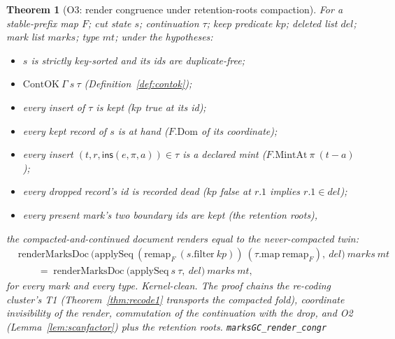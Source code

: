 \documentclass[11pt]{article}
\newtheorem{theorem}{Theorem}[section]
\newcommand{\lean}[1]{\texttt{#1}}
\newcommand{\ins}{\mathsf{ins}}
\begin{document}
\begin{theorem}[O3: render congruence under retention-roots
compaction]
\label{thm:marksgc}
For a stable-prefix map $F$; cut state $s$; continuation $\tau$; keep
predicate $\mathit{kp}$; deleted list $\mathit{del}$; mark list
$\mathit{marks}$; type $\mathit{mt}$; under the hypotheses:
\begin{itemize}[leftmargin=2em]
\item[($h_{\mathrm{sort}}$, $h_{\mathrm{nd}}$)] $s$ is strictly
  key-sorted and its ids are duplicate-free;
\item[($h_{\mathrm{ok}}$)] $\mathrm{ContOK}\ \Gamma\ s\ \tau$
  (Definition~\ref{def:contok});
\item[($h_{\mathrm{kp}}$)] every insert of $\tau$ is kept
  ($\mathit{kp}$ true at its id);
\item[($h_{\mathrm{dom}}$)] every kept record of $s$ is at hand
  ($F.\mathrm{Dom}$ of its coordinate);
\item[($h_{\mathrm{mint}}$)] every insert $(t, r, \ins(e, \pi, a))
  \in \tau$ is a declared mint ($F.\mathrm{MintAt}\ \pi\ (t - a)$);
\item[($h_{\mathrm{dead}}$)] every dropped record's id is recorded
  dead ($\mathit{kp}$ false at $r.1$ implies $r.1 \in \mathit{del}$);
\item[($h_{\mathrm{anchor}}$)] every present mark's two boundary ids
  are kept (the retention roots),
\end{itemize}
the compacted-and-continued document renders equal to the
never-compacted twin:
\[
\begin{aligned}
  &\mathrm{renderMarksDoc}\ \bigl(\mathrm{applySeq}\
  (\mathrm{remap}_F\ (s.\mathrm{filter}\ \mathit{kp}))\
  (\tau.\mathrm{map}\ \mathrm{remap}_F),\ \mathit{del}\bigr)\
  \mathit{marks}\ \mathit{mt} \\
  &\qquad=\;
  \mathrm{renderMarksDoc}\ \bigl(\mathrm{applySeq}\ s\ \tau,\
  \mathit{del}\bigr)\ \mathit{marks}\ \mathit{mt},
\end{aligned}
\]
for every mark and every type. Kernel-clean. The proof chains the
re-coding cluster's T1 (Theorem~\ref{thm:recode1} transports the
compacted fold), coordinate invisibility of the render, commutation
of the continuation with the drop, and O2
(Lemma~\ref{lem:scanfactor}) plus the retention roots.
\hfill\lean{marksGC\_render\_congr}
\end{theorem}
\end{document}
